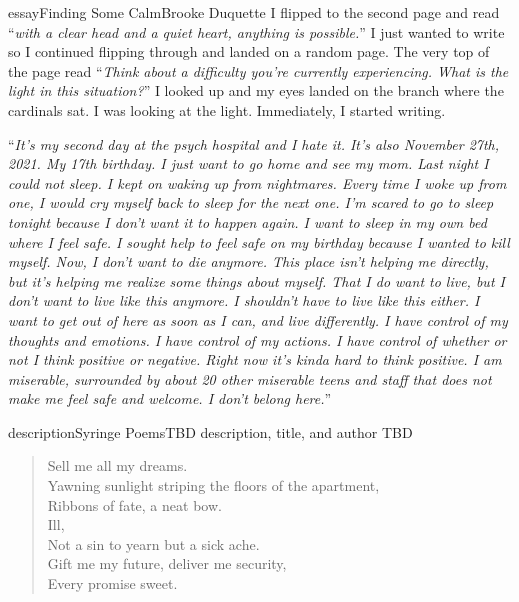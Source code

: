 \begin{prose}{essay}{Finding Some Calm}{Brooke Duquette}
    I flipped to the second page and read “\textit{with a clear head and a quiet heart, anything is possible.}” I just wanted to write so I continued flipping through and landed on a random page. The very top of the page read “\textit{Think about a difficulty you're currently experiencing. What is the light in this situation?}” I looked up and my eyes landed on the branch where the cardinals sat. I was looking at the light. Immediately, I started writing.\par
    “\textit{It's my second day at the psych hospital and I hate it. It's also November 27th, 2021. My 17th birthday. I just want to go home and see my mom. Last night I could not sleep. I kept on waking up from nightmares. Every time I woke up from one, I would cry myself back to sleep for the next one. I'm scared to go to sleep tonight because I don't want it to happen again. I want to sleep in my own bed where I feel safe. I sought help to feel safe on my birthday because I wanted to kill myself. Now, I don't want to die anymore. This place isn't helping me directly, but it's helping me realize some things about myself. That I do want to live, but I don't want to live like this anymore. I shouldn't have to live like this either. I want to get out of here as soon as I can, and live differently. I have control of my thoughts and emotions. I have control of my actions. I have control of whether or not I think positive or negative. Right now it's kinda hard to think positive. I am miserable, surrounded by about 20 other miserable teens and staff that does not make me feel safe and welcome. I don't belong here.}”
\end{prose}


\begin{prose}{description}{Syringe Poems}{TBD}
    \LARGE description, title, and author TBD
\end{prose}

\clearpage
\setauthor{}

\begin{verse}
    Sell me all my dreams.\\
    Yawning sunlight striping the floors of the apartment,\\
    Ribbons of fate, a neat bow.\\
    Ill,\\
    Not a sin to yearn but a sick ache.\\
    Gift me my future, deliver me security,\\
    Every promise sweet.\\
\end{verse}

